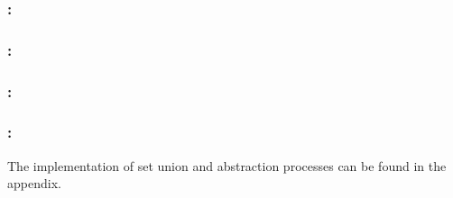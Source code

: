 \subsubsection{:}


\subsubsection{:}


\subsubsection{:}


\subsubsection{:}
The implementation of set union and abstraction processes can be found in the appendix.
